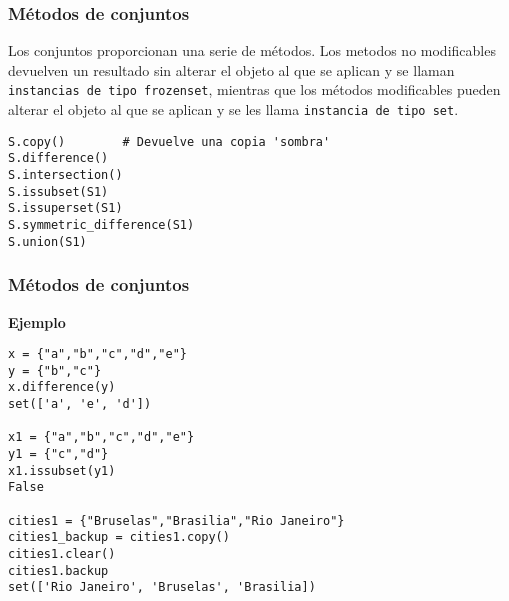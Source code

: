 \documentclass[10pt]{beamer}
\begin{document}
\begin{frame}[fragile]
\frametitle {M\'etodos de conjuntos}


\vspace{0.2cm}

Los conjuntos proporcionan una serie de m\'etodos. Los metodos no modificables devuelven un resultado sin alterar el objeto al que se aplican y se llaman \texttt{instancias de tipo frozenset}, mientras que los m\'etodos modificables pueden alterar el objeto al que se aplican y se les llama \texttt{instancia de tipo set}.

\vspace{0.2cm}

\begin{lstlisting}
S.copy()        # Devuelve una copia 'sombra'
S.difference()  
S.intersection()
S.issubset(S1)  
S.issuperset(S1)
S.symmetric_difference(S1)
S.union(S1)

\end{lstlisting}
\end{frame}

\begin{frame}[fragile]
\frametitle {M\'etodos de conjuntos}

\vspace{0.2cm}

\textbf{Ejemplo}

\vspace{0.2cm}

\begin{lstlisting}
x = {"a","b","c","d","e"}
y = {"b","c"}
x.difference(y)
set(['a', 'e', 'd'])

x1 = {"a","b","c","d","e"}
y1 = {"c","d"}
x1.issubset(y1)
False

cities1 = {"Bruselas","Brasilia","Rio Janeiro"}
cities1_backup = cities1.copy()
cities1.clear()
cities1.backup
set(['Rio Janeiro', 'Bruselas', 'Brasilia])
\end{lstlisting}
\end{frame}
\end{document}

